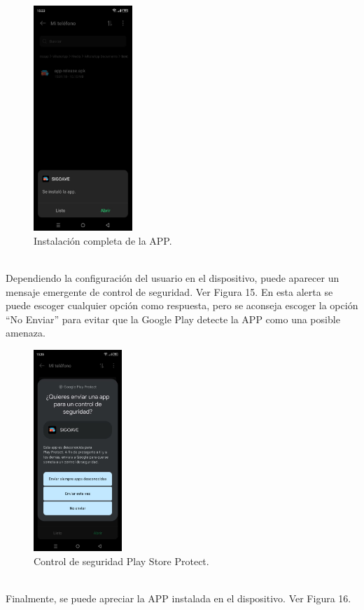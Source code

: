 \documentclass[a4paper,10pt, oneside, titlepage]{article}
\begin{document}
	\begin{figure}[!h]
		\centering
		\includegraphics[width = 0.45\linewidth, height = 8.5cm]{14.jpeg}
		\caption{Instalación completa de la APP.}
	\end{figure}\\
	Dependiendo la configuración del usuario en el dispositivo, puede aparecer un mensaje emergente de control de seguridad. Ver Figura 15. En esta alerta se puede escoger cualquier opción como respuesta, pero se aconseja escoger la opción ``No Enviar'' para evitar que la Google Play detecte la APP como una posible amenaza.
	\begin{figure}[!h]
		\centering
		\includegraphics[width = 0.45\linewidth, height = 7.6cm]{15.jpeg}
		\caption{Control de seguridad Play Store Protect.}
	\end{figure}\\
	Finalmente, se puede apreciar la APP instalada en el dispositivo. Ver Figura 16.
\end{document}
